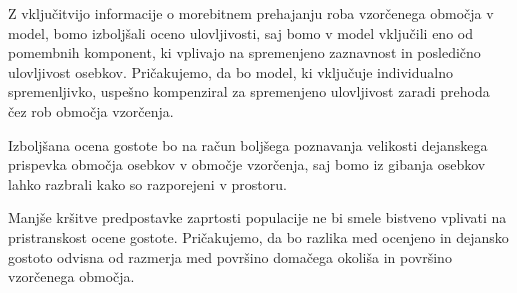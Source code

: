 Z vključitvijo informacije o morebitnem prehajanju roba vzorčenega območja v model, bomo izboljšali oceno ulovljivosti, saj bomo v model vključili eno od pomembnih komponent, ki vplivajo na spremenjeno zaznavnost in posledično ulovljivost osebkov. Pričakujemo, da bo model, ki vključuje individualno spremenljivko, uspešno kompenziral za spremenjeno ulovljivost zaradi prehoda čez rob območja vzorčenja.

Izboljšana ocena gostote bo na račun boljšega poznavanja velikosti dejanskega prispevka območja osebkov v območje vzorčenja, saj bomo iz gibanja osebkov lahko razbrali kako so razporejeni v prostoru.

Manjše kršitve predpostavke zaprtosti populacije ne bi smele bistveno vplivati na pristranskost ocene gostote. Pričakujemo, da bo razlika med ocenjeno in dejansko gostoto odvisna od razmerja med površino domačega okoliša in površino vzorčenega območja.
